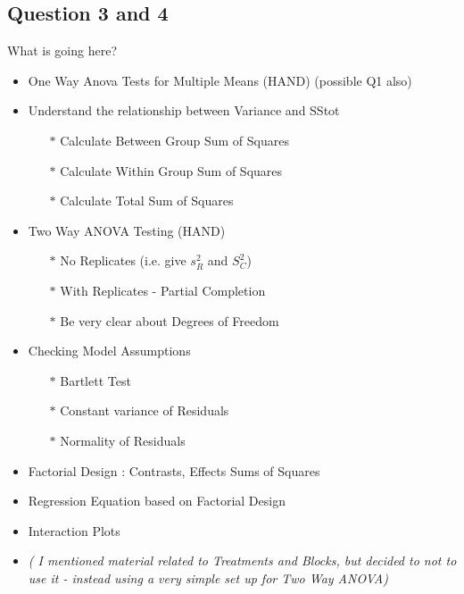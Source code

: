 \documentclass[a4paper,12pt]{article}
\begin{document}
\subsection*{Question 3 and 4}

\begin{framed}
	What is going here?
	\begin{itemize}
		\item One Way Anova Tests for Multiple Means (HAND) (possible Q1 also)
		\item Understand the relationship between Variance and SStot
	\begin{itemize}
		\item[$\ast$] Calculate Between Group Sum of Squares
		\item[$\ast$]  Calculate Within Group Sum of Squares
		\item[$\ast$]  Calculate Total Sum of Squares
	\end{itemize}
		\item Two Way ANOVA Testing (HAND)
		\begin{itemize}
			\item[$\ast$] No Replicates (i.e. give $s^2_R$ and $S^2_C$)
			\item[$\ast$] With Replicates - Partial Completion
			\item[$\ast$] Be very clear about Degrees of Freedom
		\end{itemize}
		\item Checking Model Assumptions 
				\begin{itemize}
					\item[$\ast$] Bartlett Test
					\item[$\ast$] Constant variance of Residuals
					\item[$\ast$] Normality of Residuals
				\end{itemize}
	\item Factorial Design :  Contrasts, Effects Sums of Squares
	\item Regression Equation based on Factorial Design
	\item Interaction Plots
	\item \textit{( I mentioned material related to Treatments and Blocks, but decided to not to use it - instead using a very simple set up for Two Way ANOVA)}
	\end{itemize}
\end{framed}
\end{document}
